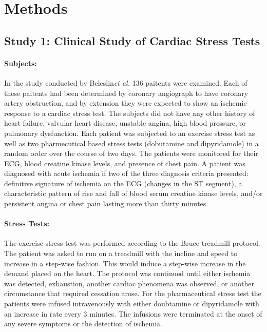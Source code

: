 \documentclass[12pt]{article}
\newcommand{\etal}{{\em et al.}}
\begin{document}


\section{Methods}
\subsection{Study 1: Clinical Study of Cardiac Stress Tests}
\paragraph{Subjects:}
In the study conducted  by Beleslin\etal\cite{Beleslin1994} 136 paitents were examined. Each of these paitents had been determined by coronary angiograph to have coronary artery obstruction, and by extension they were expected to show an ischemic response to a cardiac stress test. The subjects did not have any other history of heart failure, valvular heart disease, unstable angina, high blood pressure, or pulmonary dysfunction. Each patient was subjected to an exercise stress test as well as two pharmecutical based stress tests (dobutamine and dipyridamole) in a random order over the course of two days. The patients were monitored for their ECG, blood creatine kinase levels,  and presence of chest pain. A patient was diagnosed with acute ischemia if two of the three diagnosis criteria presented: definitive signature of ischemia on the ECG (changes in the ST segment), a characteristic pattern of rise and fall of blood serum creatine kinase levels, and/or persistent angina or chest pain lasting more than thirty minutes.

\paragraph{Stress Tests:}
The exercise stress test was performed according to the Bruce treadmill protocol. The patient was asked to run on a treadmill with the incline and speed to increase in a step-wise fashion. This would induce a step-wise increase in the demand placed on the heart. The protocol was continued until either ischemia was detected, exhaustion, another cardiac phenomena was observed, or another circumstance that required cessation arose. For the pharmaceutical stress test the patients were infused intravenously with either doubtamine or dipyridamole with an increase in rate every 3 minutes. The infusions were terminated at the onset of any severe symptoms or the detection of ischemia. 
\end{document}
